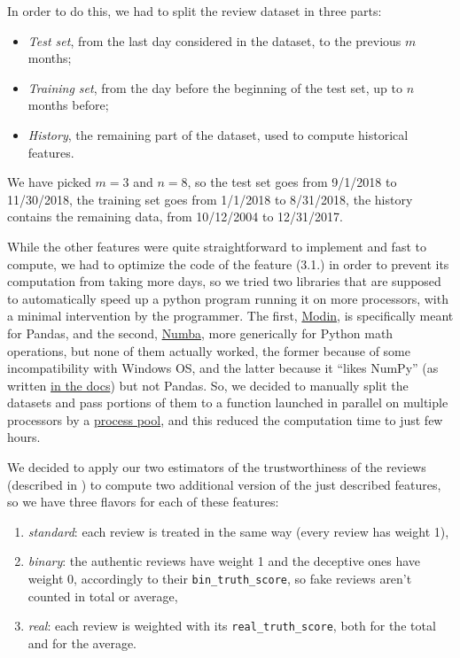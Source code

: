 In order to do this, we had to split the review dataset in three parts:
\begin{itemize}
	\item \textit{Test set}, from the last day considered in the dataset, to the previous $m$ months;
	\item \textit{Training set}, from the day before the beginning of the test set, up to $n$ months before;
	\item \textit{History}, the remaining part of the dataset, used to compute historical features.
\end{itemize}
We have picked $m=3$ and $n=8$, so the test set goes from 9/1/2018 to 11/30/2018, the training set goes from 1/1/2018 to 8/31/2018, the history contains the remaining data, from 10/12/2004 to 12/31/2017.

While the other features were quite straightforward to implement and fast to compute, we had to optimize the code of the feature (3.1.) in order to prevent its computation from taking more days, so we tried two libraries that are supposed to automatically speed up a python program running it on more processors, with a minimal intervention by the programmer. The first, \href{https://modin.readthedocs.io/en/latest/index.html}{Modin}, is specifically meant for Pandas, and the second, \href{https://numba.pydata.org/}{Numba}, more generically for Python math operations, but none of them actually worked, the former because of some incompatibility with Windows OS, and the latter because it ``likes NumPy'' (as written \href{http://numba.pydata.org/numba-doc/latest/user/5minguide.html#will-numba-work-for-my-code}{in the docs}) but not Pandas. So, we decided to manually split the datasets and pass portions of them to a function launched in parallel on multiple processors by a \href{https://docs.python.org/3.6/library/multiprocessing.html#module-multiprocessing.pool}{process pool}, and this reduced the computation time to just few hours.

We decided to apply our two estimators of the trustworthiness of the reviews (described in ) to compute two additional version of the just described features, so we have three flavors for each of these features:
\begin{enumerate}
	\item \textit{standard}: each review is treated in the same way (every review has weight 1),
	\item \textit{binary}: the authentic reviews have weight 1 and the deceptive ones have weight 0, accordingly to their \texttt{bin\_truth\_score}, so fake reviews aren't counted in total or average,
	\item \textit{real}: each review is weighted with its \texttt{real\_truth\_score}, both for the total and for the average.
\end{enumerate}


